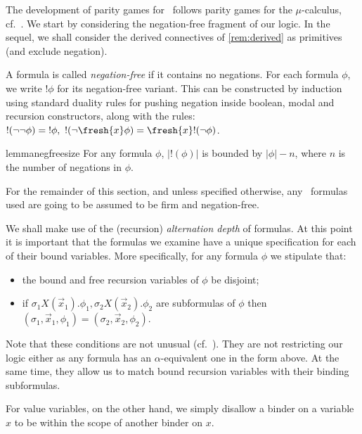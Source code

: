 The development of parity games for \fhml\ follows
parity games for the $\mu$-calculus, cf.~\cite{EmersonJutla91}. We start by
considering the negation-free fragment of our logic. In the sequel, we shall consider the derived connectives of \cref{rem:derived} as primitives (and exclude negation).

\begin{definition}
  A formula is called \emph{negation-free}
  if it contains no negations. For each formula $\phi$, we
write $!\phi$ for its negation-free variant. This can be constructed by induction using standard duality rules for pushing negation inside boolean, modal and recursion constructors, along with the rules: \
$ !(\lnot\lnot\phi)={!\phi},\
        !(\lnot \fresh{x} \phi) = \fresh{x} !(\lnot \phi) 
$.
\end{definition}


\begin{restatable}{lemma}{negfreesize}\label{lem:negfreesize}
    For any formula $\phi$, $|!(\phi)|$ is bounded by $|\phi| - n$, where $n$ is the number of negations in $\phi$. 
\end{restatable}

For the remainder of this section, and unless specified otherwise, any \fhml\ formulas used are going to be assumed to be firm and negation-free.

We shall make use of the (recursion) \emph{alternation depth} of formulas. At this point it is important that the formulas we examine have a unique specification for each of their bound variables. More specifically, for any formula $\phi$ we stipulate that:
\begin{itemize}
\item the bound and free recursion variables of $\phi$ be disjoint;
\item if $\sigma_1 X(\vec x_1).\phi_1,\sigma_2 X(\vec x_2).\phi_2$ are subformulas of $\phi$ then $(\sigma_1,\vec x_1,\phi_1)=(\sigma_2,\vec x_2,\phi_2)$.
\end{itemize}
Note that these conditions are not unusual (cf.~\cite{KlinL17}). They are not restricting our logic either as any formula has an $\alpha$-equivalent one in the form above. At the same time, they allow us to match bound recursion variables with their binding subformulas.

For value variables, on the other hand, we simply disallow a binder on a variable $x$ to be within the scope of another binder on $x$.

